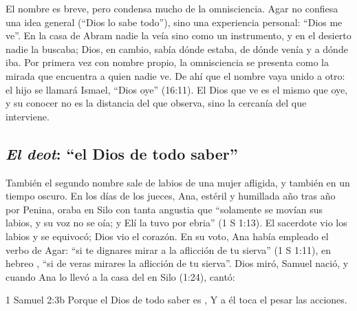 
El nombre es breve, pero condensa mucho de la omnisciencia. Agar no confiesa una idea general (``Dios lo sabe todo''), sino una experiencia personal: ``Dios me ve''. En la casa de Abram nadie la veía sino como un instrumento, y en el desierto nadie la buscaba; Dios, en cambio, sabía dónde estaba, de dónde venía y a dónde iba. Por primera vez con nombre propio, la omnisciencia se presenta como la mirada que encuentra a quien nadie ve. De ahí que el nombre vaya unido a otro: el hijo se llamará Ismael, ``Dios oye'' (16:11). El Dios que ve es el mismo que oye, y su conocer no es la distancia del que observa, sino la cercanía del que interviene.

\subsection{\emph{El deot}: “el Dios de todo saber”}

También el segundo nombre sale de labios de una mujer afligida, y también en un tiempo oscuro. En los días de los jueces, Ana, estéril y humillada año tras año por Penina, oraba en Silo con tanta angustia que ``solamente se movían sus labios, y su voz no se oía; y Elí la tuvo por ebria'' (1 S 1:13). El sacerdote vio los labios y se equivocó; Dios vio el corazón. En su voto, Ana había empleado el verbo de Agar: ``si te dignares mirar a la aflicción de tu sierva'' (1 S 1:11), en hebreo , ``si de veras mirares la aflicción de tu sierva''. Dios miró, Samuel nació, y cuando Ana lo llevó a la casa del \SENOR{} en Silo (1:24), cantó:

\begin{verso}{1 Samuel 2:3b}
Porque el Dios de todo saber es \SENOR{}, Y a él toca el pesar las acciones.
\end{verso}

